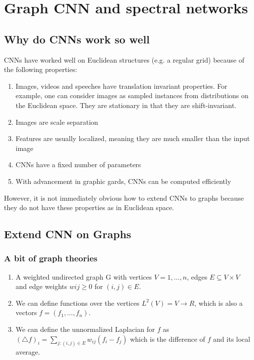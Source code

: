 \chapter{Graph CNN and spectral networks}

\section{Why do CNNs work so well}
CNNs have worked well on Euclidean structures (e.g. a regular grid) because of the following properties:
\begin{enumerate}
    \item Images, videos and speeches have translation invariant properties. For example, one can consider images as sampled instances from distributions on the Euclidean space. They are stationary in that they are shift-invariant. 
    \item Images are scale separation 
    \item Features are usually localized, meaning they are much smaller than the input image
    \item CNNs have a fixed number of parameters 
    \item With advancement in graphic gards, CNNs can be computed efficiently 
\end{enumerate}
However, it is not immediately obvious how to extend CNNs to graphs because they do not have these properties as in Euclidean space.

\section{Extend CNN on Graphs}
\subsection{A bit of graph theories}

\begin{enumerate}
    \item A weighted undirected graph G with
vertices $V = {1, . . . , n}$, edges $E \subseteq V × V$
and edge weights $wij \geq 0$ for $(i, j) \in E$. 
    \item We can define functions over the vertices $L^2(V) = {V \to R}$, which is also a vectors $f = (f_1, . . . , f_n)$.
    \item We can define the unnormalized Laplacian for $f$ as $(\bigtriangleup f)_i = \sum_{j: (i, j)\in E} w_{ij} (f_i - f_j) $ which is the difference of $f$ and its local average. 
\end{enumerate}

